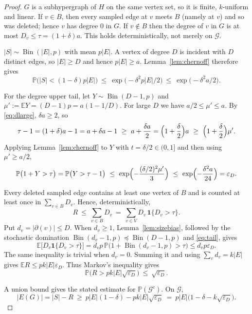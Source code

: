 \documentclass[10pt,a4paper]{amsart}
\newcommand{\VV}{V}
\newcommand{\EE}{E}
\newcommand{\PP}{\mathbb{P}}
\newcommand{\EX}{\mathbb{E}}
\newcommand{\Bin}{\operatorname{Bin}}
\newcommand{\dg}{\partial}
\begin{document}
\begin{proof}
$G$ is a subhypergraph of $H$ on the same vertex set, so it is finite, $k$-uniform and
linear. If $v\in B$, then every sampled edge at $v$ meets
$B$ (namely at $v$) and so was deleted; hence $v$ has degree $0$ in $G$. If $v\notin B$
then the degree of $v$ in $G$ is at most $D_v\le\tau=(1+\delta)a$. This holds
deterministically, not merely on $\mathcal{G}$.

$|S|\sim\Bin(|\EE|,p)$ with mean $p|\EE|$. A vertex of degree $D$ is incident with $D$
distinct edges, so $|\EE|\ge D$ and hence $p|\EE|\ge a$. Lemma~\ref{lem:chernoff}
therefore gives
\[
  \PP\bigl(|S|<(1-\delta)p|\EE|\bigr)
  \ \le\ \exp\bigl(-\delta^2p|\EE|/2\bigr)
  \ \le\ \exp\bigl(-\delta^2a/2\bigr).
\]

For the degree upper tail, let $Y\sim\Bin(D-1,p)$ and
$\mu':=\EX Y=(D-1)p=a(1-1/D)$. For large $D$ we have $a/2\le\mu'\le a$. By
\eqref{eq:dlarge}, $\delta a\ge2$, so
\[
  \tau-1=(1+\delta)a-1=a+\delta a-1\ \ge\ a+\frac{\delta a}{2}
  =\Bigl(1+\frac{\delta}{2}\Bigr)a\ \ge\ \Bigl(1+\frac{\delta}{2}\Bigr)\mu' .
\]
Applying Lemma~\ref{lem:chernoff} to $Y$ with $t=\delta/2\in(0,1]$ and then using
$\mu'\ge a/2$,
\begin{equation}
\label{eq:tail}
  \PP\bigl(1+Y>\tau\bigr)=\PP\bigl(Y>\tau-1\bigr)
  \ \le\ \exp\Bigl(-\frac{(\delta/2)^2\mu'}{3}\Bigr)
  \ \le\ \exp\Bigl(-\frac{\delta^2 a}{24}\Bigr)=\varepsilon_D .
\end{equation}

Every deleted sampled edge contains at least one vertex of $B$ and is counted at least
once in $\sum_{v\in B}D_v$. Hence, deterministically,
\[
  R\ \le\ \sum_{v\in B}D_v\ =\ \sum_{v\in \VV}D_v\,\mathbf{1}\{D_v>\tau\}.
\]
Put $d_v=|\dg(v)|\le D$. When $d_v\ge1$, Lemma~\ref{lem:sizebias}, followed by the
stochastic domination $\Bin(d_v-1,p)\preceq\Bin(D-1,p)$ and \eqref{eq:tail}, gives
\[
  \EX\bigl[D_v\mathbf{1}\{D_v>\tau\}\bigr]
  =d_vp\,\PP\bigl(1+\Bin(d_v-1,p)>\tau\bigr)
  \le d_vp\varepsilon_D .
\]
The same inequality is trivial when $d_v=0$. Summing it and using
$\sum_vd_v=k|\EE|$ gives $\EX R\le pk|\EE|\varepsilon_D$. Thus Markov's inequality
gives
\[
  \PP\bigl(R>pk|\EE|\sqrt{\varepsilon_D}\bigr)\ \le\ \sqrt{\varepsilon_D}.
\]

A union bound gives the stated estimate for $\PP(\mathcal{G}^c)$. On $\mathcal{G}$,
\[
  |E(G)|=|S|-R\ \ge\ p|\EE|(1-\delta)-pk|\EE|\sqrt{\varepsilon_D}
  \ =\ p|\EE|\bigl(1-\delta-k\sqrt{\varepsilon_D}\bigr).
\]
\end{proof}
\end{document}
